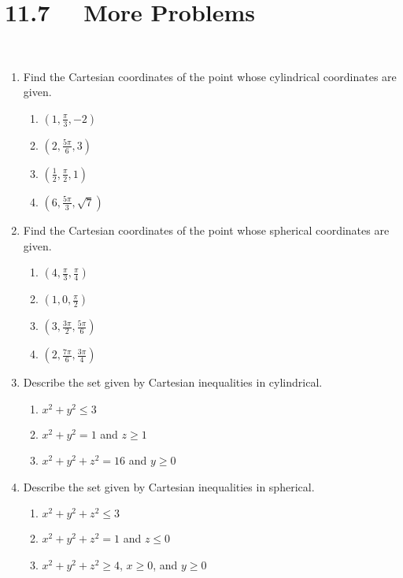 \section*{11.7 \ \ More Problems}

\ 


\begin{enumerate}
\item  Find the Cartesian coordinates of the point whose cylindrical coordinates are given.
\begin{enumerate}
\item  $(1, \frac{\pi}{3}, -2)$ \\
\item  $(2, \frac{5\pi}{6}, 3)$ \\
\item  $(\frac{1}{2}, \frac{\pi}{2}, 1)$ \\
\item  $(6, \frac{5\pi}{3}, \sqrt{7})$ \\
\end{enumerate}

\item  Find the Cartesian coordinates of the point whose spherical coordinates are given.
\begin{enumerate}
\item  $(4, \frac{\pi}{3}, \frac{\pi}{4})$ \\
\item  $(1, 0, \frac{\pi}{2})$ \\
\item  $(3, \frac{3\pi}{2}, \frac{5\pi}{6})$ \\
\item  $(2, \frac{7\pi}{6}, \frac{3\pi}{4})$ \\
\end{enumerate}

\item Describe the set given by Cartesian inequalities in cylindrical.
\begin{enumerate}
\item  $x^2 + y^2 \leq 3$  \\
\item  $x^2 + y^2 = 1$ and $z \geq 1$ \\
\item  $x^2 + y^2 + z^2 = 16$ and $y \geq 0$ \\
\end{enumerate}

\item  Describe the set given by Cartesian inequalities in spherical.
\begin{enumerate}
\item  $x^2 + y^2 + z^2 \leq 3$  \\
\item  $x^2 + y^2 + z^2 = 1$ and $z \leq 0$ \\
\item  $x^2 + y^2 + z^2 \geq 4$, $x \geq 0$, and $y \geq 0$ \\
\end{enumerate}


\end{enumerate}

